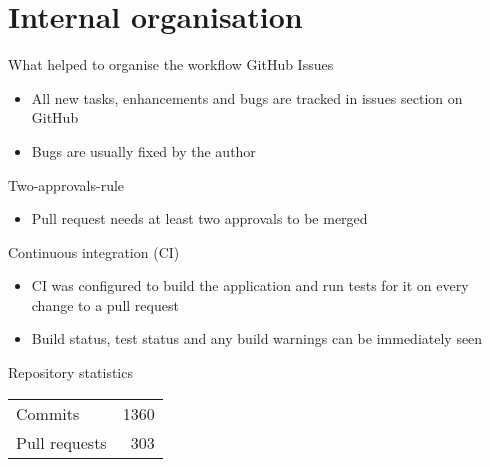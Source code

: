 \section{Internal organisation}
\begin{frame}{What helped to organise the workflow}
GitHub Issues
\begin{itemize}
	\item{All new tasks, enhancements and bugs are tracked in issues section on GitHub}
	\item{Bugs are usually fixed by the author}
\end{itemize}

Two-approvals-rule
\begin{itemize}
	\item{Pull request needs at least two approvals to be merged}
\end{itemize}

Continuous integration (CI) 
\begin{itemize}
	\item{CI was configured to build the application and run tests for it on every change to a pull request}
	\item{Build status, test status and any build warnings can be immediately seen}
\end{itemize}
\end{frame}

\begin{frame}{Repository statistics}
\begin{tabular}{l r}
Commits & 1360\\
Pull requests & 303\\
\end{tabular}
\end{frame}
